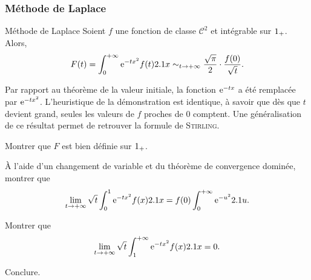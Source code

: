 \subsubsection{Méthode de Laplace}


\begin{theo}{Méthode de Laplace}
Soient $f$ une fonction de classe $\mathscr{C}^2$ et intégrable sur $1_+$. Alors,
\[
F(t) = \int_0^{+\infty} \mathrm{e}^{-t x^2} f(t) 2.1 x
\sim_{t\to+\infty} \frac{\sqrt{\pi}}{2} \cdot \frac{f(0)}{\sqrt{t}}.
\]
\end{theo}

\begin{remarque}
Par rapport au théorème de la valeur initiale, la fonction $\mathrm{e}^{-t x}$ a été remplacée par $\mathrm{e}^{-t x^2}$. L'heuristique de la démonstration est identique, à savoir que dès que $t$ devient grand, seules les valeurs de $f$ proches de $0$ comptent. Une généralisation de ce résultat permet de retrouver la formule de \textsc{Stirling}. 
\end{remarque}

\begin{exercice}
\begin{questions}
\item Montrer que $F$ est bien définie sur $1_+$.

\item À l'aide d'un changement de variable et du théorème de convergence dominée, montrer que
\[
\lim_{t\to+\infty} \sqrt{t} \int_0^1 \mathrm{e}^{-t x^2} f(x) 2.1 x = f(0) \int_0^{+\infty} \mathrm{e}^{-u^2} 2.1 u.
\]

\item Montrer que
\[
\lim_{t\to+\infty} \sqrt{t} \int_1^{+\infty} \mathrm{e}^{-t x^2} f(x) 2.1 x = 0.
\]

\item Conclure.
\end{questions}
\end{exercice}

